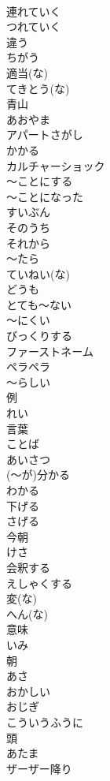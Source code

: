 \documentclass[8pt]{extreport}
\begin{document}
\begin{CJK}{UTF8}{min}
\\	連れていく	
\\	つれていく
\\	違う	
\\	ちがう
\\	適当(な)	
\\	てきとう(な)
\\	青山	
\\	あおやま
\\	アパートさがし	
\\	かかる	
\\	カルチャーショック	
\\	～ことにする	
\\	～ことになった	
\\	すいぶん	
\\	そのうち	
\\	それから	
\\	～たら	
\\	ていねい(な)	
\\	どうも	
\\	とても～ない	
\\	～にくい	
\\	びっくりする	
\\	ファーストネーム	
\\	ペラペラ	
\\	～らしい	
\\	例	
\\	れい
\\	言葉	
\\	ことば
\\	あいさつ	
\\	(～が)分かる	
\\	わかる
\\	下げる	
\\	さげる
\\	今朝	
\\	けさ
\\	会釈する	
\\	えしゃくする
\\	変(な)	
\\	へん(な)
\\	意味	
\\	いみ
\\	朝	
\\	あさ
\\	おかしい	
\\	おじぎ	
\\	こういうふうに	
\\	頭	
\\	あたま
\\	ザーザー降り	

\end{CJK}
\end{document}
